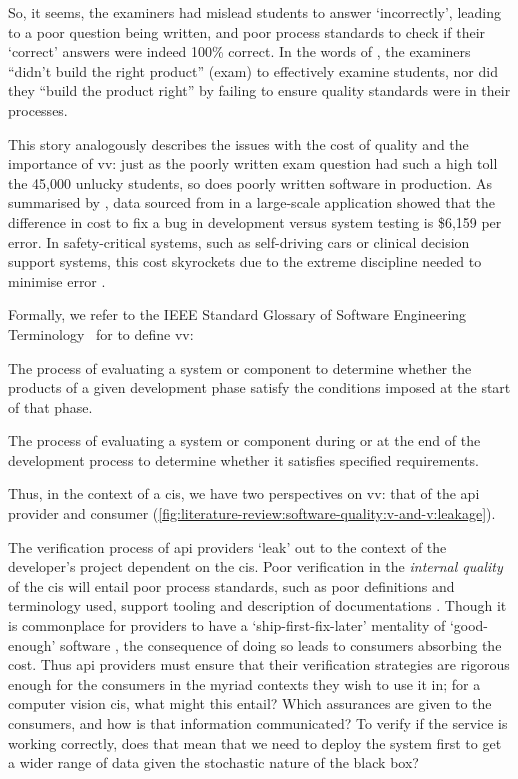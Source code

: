 So, it seems, the examiners had mislead students to answer `incorrectly', leading to a poor question being written, and poor process standards to check if their `correct' answers were indeed 100\% correct. In the words of \citet{Boehm:1981ua}, the examiners ``didn't build the right product'' (exam) to effectively examine students, nor did they ``build the product right'' by failing to ensure quality standards were in their processes. 

This story analogously describes the issues with the cost of quality \citep{Boehm:2005vj} and the importance of \gls{vv}: just as the poorly written exam question had such a high toll the 45,000 unlucky students, so does poorly written software in production. As summarised by \citet{Pressman:2005vf}, data sourced from \citet{Cigital:2003tl} in a large-scale application showed that the difference in cost to fix a bug in development versus system testing is \$6,159 per error. In safety-critical systems, such as self-driving cars or clinical decision support systems, this cost skyrockets due to the extreme discipline needed to minimise error \citep{Tassey:2002vu}.

Formally, we refer to the IEEE Standard Glossary of Software Engineering Terminology~\citep{IEEE:1990wp} for to define \gls{vv}:

\begin{description}[font=\itshape,style=multiline,leftmargin=3cm]
  \item[verification] The process of evaluating a system or component to determine whether the products of a given development phase satisfy the conditions imposed at the start of that phase.
  \item[validation] The process of evaluating a system or component during or at the end of the development process to determine whether it satisfies specified requirements. 
\end{description} 

\noindent
Thus, in the context of a \gls{cis}, we have two perspectives on \gls{vv}: that of the \gls{api} provider and consumer (\cref{fig:literature-review:software-quality:v-and-v:leakage}).

The verification process of \gls{api} providers `leak' out to the context of the developer's project dependent on the \gls{cis}. Poor verification in the \textit{internal quality} of the \gls{cis} will entail poor process standards, such as poor definitions and terminology used, support tooling and description of documentations \citep{Sommerville:2011uc}. Though it is commonplace for providers to have a `ship-first-fix-later' mentality of `good-enough' software \citep{Venners:2003vw}, the consequence of doing so leads to consumers absorbing the cost. Thus \gls{api} providers must ensure that their verification strategies are rigorous enough for the consumers in the myriad contexts they wish to use it in; for a computer vision \gls{cis}, what might this entail? Which assurances are given to the consumers, and how is that information communicated? To verify if the service is working correctly, does that mean that we need to deploy the system first to get a wider range of data given the stochastic nature of the black box?

